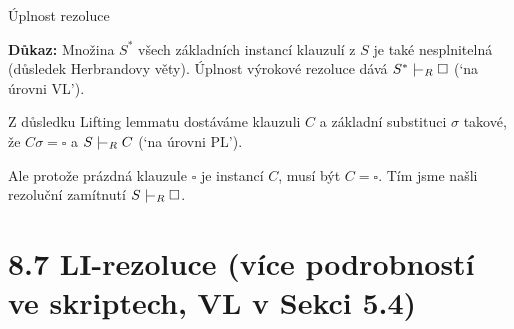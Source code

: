 \documentclass{beamer}
\begin{document}
\begin{frame}{Úplnost rezoluce}

    \pause

    \medskip

    \pause
    \textbf{Důkaz:} \pause
    Množina $S^*$ všech základních instancí klauzulí z $S$ je také nesplnitelná (důsledek Herbrandovy věty). \pause Úplnost \alert{výrokové} rezoluce dává $S^*\proves_R\square$ (`na úrovni VL').\pause 
    
    Z důsledku Lifting lemmatu dostáváme klauzuli $C$ a základní substituci $\sigma$ takové, že $C\sigma=\square$ a $S\proves_R C$ (`na úrovni PL'). \pause
    
    Ale protože prázdná klauzule $\square$ je instancí $C$, musí být $C=\square$. Tím jsme našli rezoluční zamítnutí $S\proves_R \square$.        
    \hfill\qedsymbol

\end{frame}


\section{8.7 LI-rezoluce (více podrobností ve skriptech, VL v Sekci 5.4)}
\end{document}
